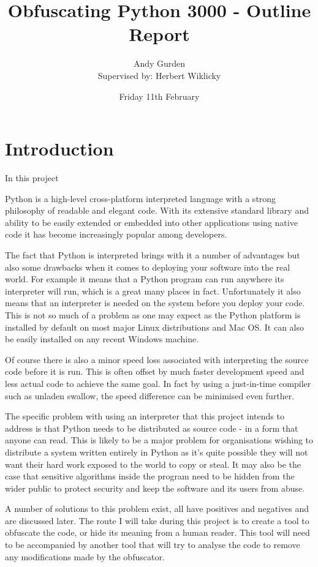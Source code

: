 \documentclass{report}
\title{Obfuscating Python 3000 - Outline Report}
\author{Andy Gurden\\Supervised by: Herbert Wiklicky}
\date{Friday 11th February}
\begin{document}
\maketitle

\section{Introduction}

In this project

Python is a high-level cross-platform interpreted language with a
strong philosophy of readable and elegant code. With its extensive
standard library and ability to be easily extended or embedded into
other applications using native code it has become increasingly
popular among developers.

The fact that Python is interpreted brings with it a number of
advantages but also some drawbacks when it comes to deploying your
software into the real world. For example it means that a Python
program can run anywhere its interpreter will run, which is a great
many places in fact. Unfortunately it also means that an
interpreter is needed on the system before you deploy your code.
This is not so much of a problem as one may expect as the Python
platform is installed by default on most major Linux distributions
and Mac OS. It can also be easily installed on any recent Windows
machine.

Of course there is also a minor speed loss associated with
interpreting the source code before it is run. This is often offset
by much faster development speed and less actual code to achieve
the same goal. In fact by using a just-in-time compiler such as
unladen swallow, the speed difference can be minimised even
further.

The specific problem with using an interpreter that this project
intends to address is that Python needs to be distributed as source
code - in a form that anyone can read. This is likely to be a major
problem for organisations wishing to distribute a system written
entirely in Python as it's quite possible they will not want their
hard work exposed to the world to copy or steal. It may also be the
case that sensitive algorithms inside the program need to be hidden
from the wider public to protect security and keep the software and
its users from abuse.

A number of solutions to this problem exist, all have positives and
negatives and are discussed later. The route I will take during
this project is to create a tool to obfuscate the code, or hide its
meaning from a human reader. This tool will need to be accompanied
by another tool that will try to analyse the code to remove any
modifications made by the obfuscator.
\end{document}
